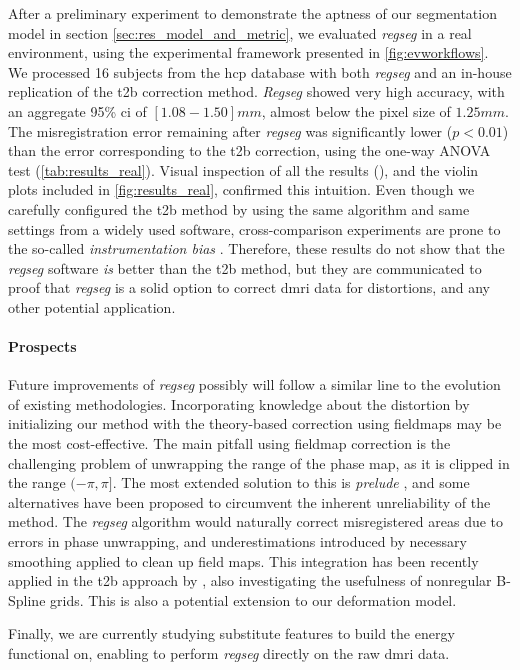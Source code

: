 After a preliminary experiment to demonstrate the aptness of our segmentation model
  in section \autoref{sec:res_model_and_metric}, we evaluated \emph{regseg} in
  a real environment, using the experimental framework presented in \autoref{fig:evworkflows}.
We processed 16 subjects from the \gls*{hcp} database with both \emph{regseg}
  and an in-house replication of the \gls*{t2b} correction method.
\emph{Regseg} showed very high accuracy, with an aggregate 95\% \gls*{ci} of $[1.08-1.50]mm$,
  almost below the pixel size of $1.25mm$.
The misregistration error remaining after \emph{regseg} was significantly lower ($p < 0.01$) than the
  error corresponding to the \gls*{t2b} correction, using the one-way ANOVA test
  (\autoref{tab:results_real}).
Visual inspection of all the results (), and the violin plots included in
  \autoref{fig:results_real}, confirmed this intuition.
Even though we carefully configured the \gls*{t2b} method by using the same algorithm and
  same settings from a widely used software, cross-comparison experiments are prone to
  the so-called \emph{instrumentation bias} \citep{tustison_instrumentation_2013}.
Therefore, these results do not show that the \emph{regseg} software \emph{is} better than the
  \gls*{t2b} method, but they are communicated to proof that \emph{regseg} is a solid option to
  correct \gls*{dmri} data for distortions, and any other potential application.

\paragraph*{Prospects}
Future improvements of \emph{regseg} possibly will follow a similar line to the evolution of 
  existing methodologies.
Incorporating knowledge about the distortion by initializing our method with the theory-based
  correction using fieldmaps may be the most cost-effective.
The main pitfall using fieldmap correction is the challenging problem of unwrapping the
  range of the phase map, as it is clipped in the range $(-\pi, \pi]$.
The most extended solution to this is \emph{prelude} \citep{jenkinson_fast_2003}, and some
  alternatives have been proposed \citep{zhou_reliable_2009,daga_susceptibility_2014} to
  circumvent the inherent unreliability of the method.
The \emph{regseg} algorithm would naturally correct misregistered areas due to errors in
  phase unwrapping, and underestimations introduced by necessary smoothing
  applied to clean up field maps.
This integration has been recently applied in the \gls*{t2b} approach
  by \cite{irfanoglu_susceptibility_2011}, also investigating the usefulness of
  nonregular B-Spline grids.
This is also a potential extension to our deformation model.

Finally, we are currently studying substitute features to build the energy functional on,
  enabling to perform \emph{regseg} directly on the raw \gls*{dmri} data.